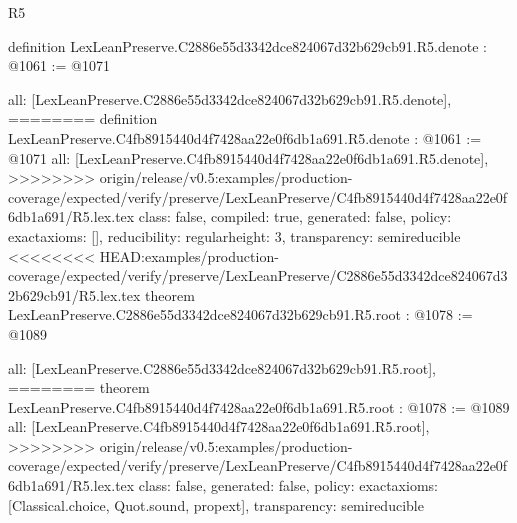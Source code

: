\begin{lexlean}{R5}
\begin{coremodule}
{{{{{{{definition LexLeanPreserve.C2886e55d3342dce824067d32b629cb91.R5.denote : @1061 := @1071 {
  all: [LexLeanPreserve.C2886e55d3342dce824067d32b629cb91.R5.denote],
========
definition LexLeanPreserve.C4fb8915440d4f7428aa22e0f6db1a691.R5.denote : @1061 := @1071 {
  all: [LexLeanPreserve.C4fb8915440d4f7428aa22e0f6db1a691.R5.denote],
>>>>>>>> origin/release/v0.5:examples/production-coverage/expected/verify/preserve/LexLeanPreserve/C4fb8915440d4f7428aa22e0f6db1a691/R5.lex.tex
  class: false,
  compiled: true,
  generated: false,
  policy: exact{axioms: []},
  reducibility: regular{height: 3},
  transparency: semireducible
}
<<<<<<<< HEAD:examples/production-coverage/expected/verify/preserve/LexLeanPreserve/C2886e55d3342dce824067d32b629cb91/R5.lex.tex
theorem LexLeanPreserve.C2886e55d3342dce824067d32b629cb91.R5.root : @1078 := @1089 {
  all: [LexLeanPreserve.C2886e55d3342dce824067d32b629cb91.R5.root],
========
theorem LexLeanPreserve.C4fb8915440d4f7428aa22e0f6db1a691.R5.root : @1078 := @1089 {
  all: [LexLeanPreserve.C4fb8915440d4f7428aa22e0f6db1a691.R5.root],
>>>>>>>> origin/release/v0.5:examples/production-coverage/expected/verify/preserve/LexLeanPreserve/C4fb8915440d4f7428aa22e0f6db1a691/R5.lex.tex
  class: false,
  generated: false,
  policy: exact{axioms: [Classical.choice, Quot.sound, propext]},
  transparency: semireducible
}

}}}}}}}}}
\end{coremodule}
\end{lexlean}
